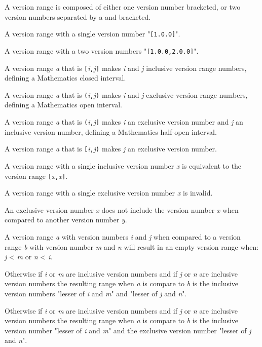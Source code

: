 \pnum
A version range is composed of either one version number bracketed,
or two version numbers separated by a   and bracketed.

\begin{example}
A version range with a single version number "\verb|[1.0.0]|".
\end{example}

\begin{example}
A version range with a two version numbers "\verb|[1.0.0,2.0.0]|".
\end{example}

\pnum
A version range \emph{a} that is \verb|[|\emph{i}\verb|,|\emph{j}\verb|]| makes
\emph{i} and \emph{j} inclusive version range numbers, defining a Mathematics
closed interval.

\pnum
A version range \emph{a} that is \verb|(|\emph{i}\verb|,|\emph{j}\verb|)| makes
\emph{i} and \emph{j} exclusive version range numbers, defining a Mathematics
open interval.

\pnum
A version range \emph{a} that is \verb|(|\emph{i}\verb|,|\emph{j}\verb|]| makes
\emph{i} an exclusive version number and \emph{j} an inclusive version number,
defining a Mathematics half-open interval.

\pnum
A version range \emph{a} that is \verb|[|\emph{i}\verb|,|\emph{j}\verb|)| makes
\emph{j} an exclusive version number.

\pnum
A version range with a single inclusive version number \emph{x} is equivalent
to the version range \verb|[|\emph{x}\verb|,|\emph{x}\verb|]|.

\pnum
A version range with a single exclusive version number \emph{x} is invalid.

\pnum
An exclusive version number \emph{x} does not include the version number
\emph{x} when compared to another version number \emph{y}.

\pnum
A version range \emph{a} with version numbers \emph{i} and \emph{j} when
compared to a version range \emph{b} with version number \emph{m} and \emph{n}
will result in an empty version range when: \emph{j} < \emph{m} or
\emph{n} < \emph{i}.

\pnum
Otherwise if \emph{i} or \emph{m} are inclusive version numbers and if \emph{j}
or \emph{n} are inclusive version numbers the resulting range when \emph{a} is
compare to \emph{b} is the inclusive version numbers "lesser of \emph{i} and
\emph{m}" and "lesser of \emph{j} and \emph{n}".

\pnum
Otherwise if \emph{i} or \emph{m} are inclusive version numbers and if \emph{j}
or \emph{n} are inclusive version numbers the resulting range when \emph{a} is
compare to \emph{b} is the inclusive version number "lesser of \emph{i} and
\emph{m}" and the exclusive version number "lesser of \emph{j} and \emph{n}".

